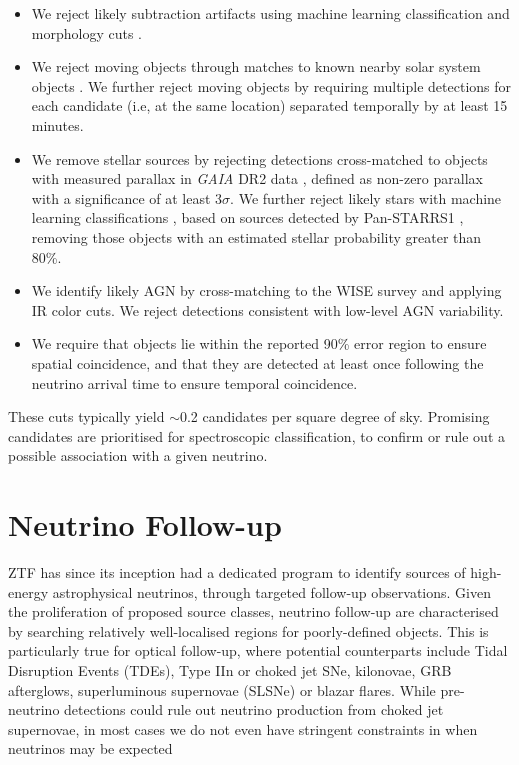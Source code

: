 \begin{itemize}
	\item We reject likely subtraction artifacts using machine learning classification and morphology cuts \cite{ztf_ml_19}.
	\item We reject moving objects through matches to known nearby solar system objects \cite{2019PASP..131a8003M}. We further reject moving objects by requiring multiple  detections for each candidate (i.e, at the same location) separated temporally by at least 15 minutes.
	\item We remove stellar sources by rejecting detections cross-matched\cite{2018PASP..130g5002S} to objects with measured parallax in \textit{GAIA} DR2 data \cite{gaia_dr2}, defined as non-zero parallax with a significance of at least 3$\sigma$. We further reject likely stars with machine learning classifications \cite{ztf_stargalaxy_18}, based on sources detected by Pan-STARRS1 \cite{panstarrs_16}, removing those objects with an estimated stellar probability greater than 80\%.
	\item We identify likely AGN by cross-matching to the WISE survey and applying IR color cuts\cite{2010AJ....140.1868W}. We reject detections consistent with low-level AGN variability. 
	\item We require that objects lie within the reported 90\% error region to ensure spatial coincidence, and that they are detected at least once following the neutrino arrival time to ensure temporal coincidence.
\end{itemize}

These cuts typically yield $\sim$0.2 candidates per square degree of sky. Promising candidates are prioritised for spectroscopic classification, to confirm or rule out a possible association with a given neutrino. 

\section{Neutrino Follow-up}
ZTF has since its inception had a dedicated program to identify sources of high-energy astrophysical neutrinos, through targeted follow-up observations. Given the proliferation of proposed source classes, neutrino follow-up are characterised by searching relatively well-localised regions for poorly-defined objects. This is particularly true for optical follow-up, where potential counterparts include Tidal Disruption Events (TDEs), Type IIn or choked jet SNe, kilonovae, GRB afterglows, superluminous supernovae (SLSNe) or blazar flares. While pre-neutrino detections could rule out neutrino production from choked jet supernovae, in most cases we do not even have stringent constraints in when neutrinos may be expected 

